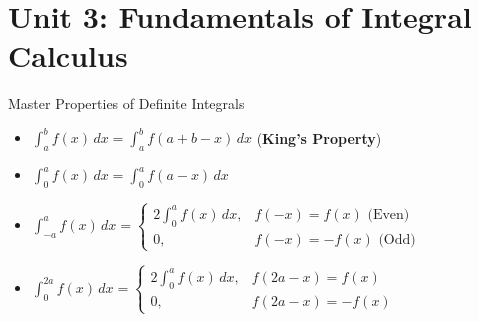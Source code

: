 \chapter{Unit 3: Fundamentals of Integral Calculus}

\begin{formulabox}{Master Properties of Definite Integrals}
\begin{itemize}[leftmargin=1.5em]
    \item $\int_a^b f(x)\,dx = \int_a^b f(a+b-x)\,dx$ (\textbf{King's Property})
    \item $\int_0^a f(x)\,dx = \int_0^a f(a-x)\,dx$
    \item $\int_{-a}^a f(x)\,dx = \begin{cases} 2\int_0^a f(x)\,dx, & f(-x) = f(x) \text{ (Even)} \\ 0, & f(-x) = -f(x) \text{ (Odd)} \end{cases}$
    \item $\int_0^{2a} f(x)\,dx = \begin{cases} 2\int_0^a f(x)\,dx, & f(2a-x) = f(x) \\ 0, & f(2a-x) = -f(x) \end{cases}$
\end{itemize}
\end{formulabox}
